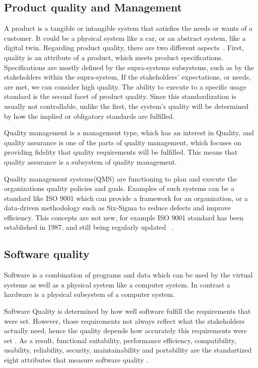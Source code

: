 \documentclass{llncs}
\begin{document}
    \subsection{Product quality and Management}
    A product is a tangible or intangible system that satisfies the needs or wants of a customer. It could be a physical system like a car, or an abstract system, like a digital twin. 
    Regarding product quality, there are two different aspects~\cite{GrievesPLMBook}.
    First, quality is an attribute of a product, which meets product specifications. Specifications are mostly defined by the supra-systems subsystems, such as by the stakeholders within the supra-system,  If the stakeholders' expectations, or needs, are met, we can consider high quality.
    The ability to execute to a specific usage standard is the second facet of product quality. Since this standardization is usually not controllable, unlike the first, the system's quality will be determined by how the implied or obligatory standards are fulfilled.

    Quality management is a management type, which has an interest in Quality, and quality assurance is one of the parts of quality management, 
    which focuses on providing fidelity that quality requirements will be fulfilled. This means that quality assurance is a subsystem of quality management.

    Quality management systems(QMS) are functioning to plan and execute the organizations quality policies and goals. 
    Examples of such systems can be a standard like ISO 9001 which can provide a framework for an organization, or a data-driven methodology such  as Six-Sigma to reduce defects and improve efficiency. 
    This concepts  are not new, for example ISO 9001 standard has been established in 1987, and still being regularly updated ~\cite{ISO90012015}. 
    \subsection{Software quality}
    Software is a combination of programs and data which can be used by the virtual 
    systems as well as  a physical system like a computer system. In contrast a hardware 
    is a physical subsystem of a computer system\cite{OxfordDictionary}. 

    Software Quality is determined by how well software fulfill the requirements that were set. However, those requirements  
    not always reflect what the stakeholders actually need, hence the quality depends how accurately this requirements were set \cite{IEE730-2014}. 
    As a result, functional suitability, performance efficiency, compatibility, usability, reliability, security, maintainability 
    and portability are the standartized  eight attributes that measure software quality \cite{ISO/IEC:25010}.
    
\end{document}
